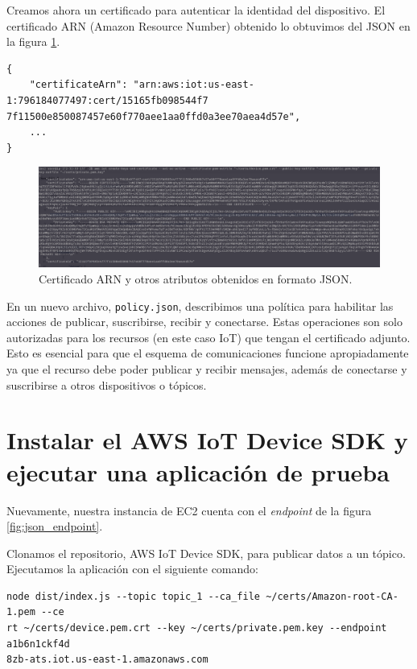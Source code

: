 \documentclass[10pt]{article}
\begin{document}
Creamos ahora un certificado para autenticar la identidad del dispositivo. El certificado ARN (Amazon Resource Number) obtenido lo obtuvimos del JSON en la figura \ref{fig:ARNcertificate}.

\begin{lstlisting}
{
    "certificateArn": "arn:aws:iot:us-east-1:796184077497:cert/15165fb098544f7
7f11500e850087457e60f770aee1aa0ffd0a3ee70aea4d57e",
    ...
}
\end{lstlisting}

\begin{figure}[H]
    \centering
    \includegraphics[width=\textwidth]{Images/ARN_JSON_terminal.png}
    \caption{Certificado ARN y otros atributos obtenidos en formato JSON.}
    \label{fig:ARNcertificate}
\end{figure}

En un nuevo archivo, \texttt{policy.json}, describimos una política para habilitar las acciones de publicar, suscribirse, recibir y conectarse. Estas operaciones son solo autorizadas para los recursos (en este caso IoT) que tengan el certificado adjunto. Esto es esencial para que el esquema de comunicaciones funcione apropiadamente ya que el recurso debe poder publicar y recibir mensajes, además de conectarse y suscribirse a otros dispositivos o tópicos.

\section{Instalar el AWS IoT Device SDK y ejecutar una aplicación de prueba}

Nuevamente, nuestra instancia de EC2 cuenta con el \textit{endpoint} de la figura \ref{fig:json_endpoint}.

Clonamos el repositorio, AWS IoT Device SDK, para publicar datos a un tópico. Ejecutamos la aplicación con el siguiente comando:

\begin{lstlisting}
node dist/index.js --topic topic_1 --ca_file ~/certs/Amazon-root-CA-1.pem --ce
rt ~/certs/device.pem.crt --key ~/certs/private.pem.key --endpoint a1b6n1ckf4d
8zb-ats.iot.us-east-1.amazonaws.com
\end{lstlisting}
\end{document}
